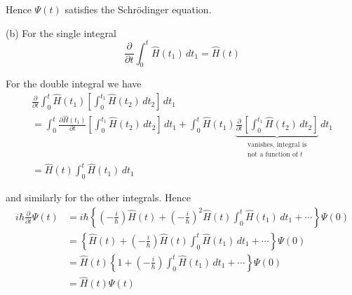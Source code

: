 Hence $\Psi(t)$ satisfies the Schr\"odinger equation.

\bigskip
{}

(b) For the single integral
\begin{equation*}
\frac{\partial}{\partial t}
\int_0^t\hat H(t_1)\,dt_1
=\hat H(t)
\end{equation*}

For the double integral we have
\begin{multline*}
\frac{\partial}{\partial t}
\int_0^t\hat H(t_1)\left[\int_0^{t_1}\hat H(t_2)\,dt_2\right]\,dt_1
\\
=\int_0^t\frac{\partial\hat H(t_1)}{\partial t}
\left[\int_0^{t_1}\hat H(t_2)\,dt_2\right]\,dt_1
+\int_0^t\hat H(t_1)
\underbrace{\frac{\partial}{\partial t}\left[\int_0^{t_1}\hat H(t_2)\,dt_2\right]}
_{\substack{\text{vanishes, integral is}\\ \text{not a function of $t$}}}
\,dt_1
\\
=\hat H(t)\int_0^t\hat H(t_1)\,dt_1
\end{multline*}

and similarly for the other integrals. Hence
\begin{align*}
i\hbar\frac{\partial}{\partial t}\Psi(t)
&=i\hbar\left\{\left(-\frac{i}{\hbar}\right)\hat H(t)+\left(-\frac{i}{\hbar}\right)^2\hat H(t)\int_0^t\hat H(t_1)\,dt_1+\cdots\right\}\Psi(0)
\\
&=\left\{\hat H(t)+\left(-\frac{i}{\hbar}\right)\hat H(t)\int_0^t\hat H(t_1)\,dt_1+\cdots\right\}\Psi(0)
\\
&=\hat H(t)\left\{1+\left(-\frac{i}{\hbar}\right)\int_0^t\hat H(t_1)\,dt_1+\cdots\right\}\Psi(0)
\\
&=\hat H(t)\Psi(t)
\end{align*}


